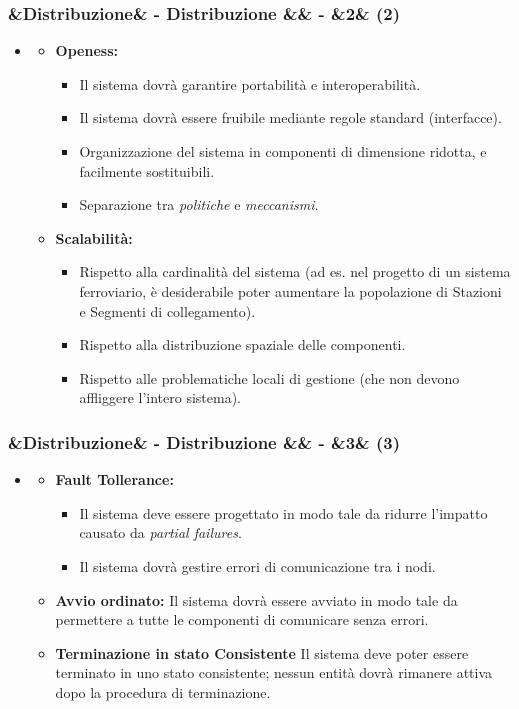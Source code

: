 \documentclass[slidestop,compress,blackandwhite]{beamer}
\newcommand{\itemB}[3]{
	\item \textbf{#1} #2 \vspace{#3}
}
\newcommand{\ii}[1]{\textit{#1}}
\newcommand{\newtitle}[4]{
	#1 
	\ifx&#2&%
	\else
  		\large- #2
	\fi
	\ifx&#3&%
	\else
  		\normalsize- #3
	\fi
	\ifx&#4&%
	\else
  		\normalsize (#4)
	\fi
}
\newcommand{\newframe}[5]{
	\begin{frame}
		\frametitle{\newtitle{#1}{#2}{#3}{#4}}
		#5
	\end{frame}
}
\newcommand{\myitemize}[1]{
	\begin{itemize}\itemsep4pt
	#1
	\end{itemize}
}
\begin{document}
	\newframe{}{Distribuzione}{}{2}{
		\myitemize {
			\item[]
				\myitemize {
					\itemB{Openess:}{\justifying
						\myitemize {
							\item Il sistema dovrà garantire portabilità e interoperabilità.
							\item Il sistema dovrà essere fruibile mediante regole standard (interfacce).
							\item \justifying Organizzazione del sistema in componenti di dimensione ridotta, e facilmente sostituibili.
							\item Separazione tra \ii{politiche} e \ii{meccanismi}.
						}
					}{0.1cm}
					\itemB{Scalabilità:}{\justifying
						\myitemize {
							\item Rispetto alla cardinalità del sistema (ad es. nel progetto di un sistema ferroviario, è desiderabile poter aumentare la popolazione di Stazioni e Segmenti di collegamento).
							\item Rispetto alla distribuzione spaziale delle componenti.
							\item Rispetto alle problematiche locali di gestione (che non devono affliggere l'intero sistema).
						}
					}{0.1cm}
				}
		}
	}
	
	\newframe{}{Distribuzione}{}{3}{
		\myitemize {
			\item[]
				\myitemize {
					\itemB{Fault Tollerance:}{
						\myitemize{
							\item Il sistema deve essere progettato in modo tale da ridurre l'impatto causato da \ii{partial failures}.
							\item Il sistema dovrà gestire errori di comunicazione tra i nodi.
						}
					}{0.1cm}
					
					\itemB{Avvio ordinato:}{\justifying Il sistema dovrà essere avviato in modo tale da permettere a tutte le componenti di comunicare senza errori.}{0.1cm}
					\itemB{Terminazione in stato Consistente}{\justifying Il sistema deve poter essere terminato in uno stato consistente; nessun entità dovrà rimanere attiva dopo la procedura di terminazione.}{0.1cm}
				}
				
		}
	}
	
\end{document}
